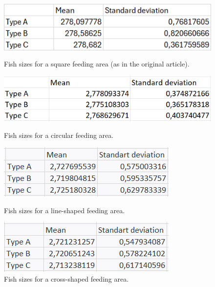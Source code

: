 \documentclass[9pt]{pnas-new}
\begin{document}
\begin{figure}[h]
    \centering

    \begin{minipage}{0.45\textwidth}
        \includegraphics[width=\textwidth]{fig/stats_square.png}
        \caption{Fish sizes for a square feeding area (as in the original article).}
    \end{minipage}
    \hfill
    \begin{minipage}{0.45\textwidth}
        \includegraphics[width=\textwidth]{fig/stats_circle.png}
        \caption{Fish sizes for a circular feeding area.}
    \end{minipage}

    \vspace{\baselineskip} %

    \begin{minipage}{0.45\textwidth}
        \includegraphics[width=\textwidth]{fig/line.png}
        \caption{Fish sizes for a line-shaped feeding area.}
    \end{minipage}
    \hfill
    \begin{minipage}{0.45\textwidth}
        \includegraphics[width=\textwidth]{fig/cross.png}
        \caption{Fish sizes for a cross-shaped feeding area.}
    \end{minipage}

\end{figure}
\end{document}
